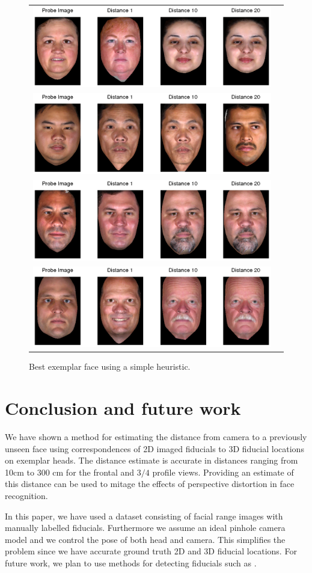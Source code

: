 \documentclass[runningheads]{llncs}
\begin{document}
\begin{figure}[h]
\centering
\begin{tabular}{cc}
\includegraphics[width=.7\linewidth]{resources/figures/best_exemplar1.png} \\
\includegraphics[width=.7\linewidth]{resources/figures/best_exemplar3.png} \\
\includegraphics[width=.7\linewidth]{resources/figures/best_exemplar10.png} \\
\includegraphics[width=.7\linewidth]{resources/figures/best_exemplar26.png}
\end{tabular}
\caption{Best exemplar face using a simple heuristic.}
\label{fig:bestexemplar}
\end{figure}

\section{Conclusion and future work}
We have shown a method for estimating the distance from camera to a previously unseen face using correspondences of 2D imaged fiducials to 3D fiducial locations on exemplar heads.  
The distance estimate is accurate in distances ranging from 10cm to 300 cm for the frontal and $3/4$ profile views.  
Providing an estimate of this distance can be used to mitage the effects of perspective distortion in face recognition.  

In this paper, we have used a dataset consisting of facial range images with manually labelled fiducials.    
Furthermore we assume an ideal pinhole camera model and we control the pose of both head and camera.  
This simplifies the problem since we have accurate ground truth 2D and 3D fiducial locations. 
For future work, we plan to use methods for detecting fiducials such as \cite{belhumeur2011localizing}.    



\end{document}

